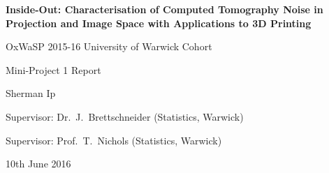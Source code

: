 \documentclass[12pt]{report}
\begin{document}
\begin{titlepage}
\centering
\vspace*{1cm}
        
        \LARGE
        \textbf{Inside-Out: Characterisation of Computed Tomography Noise in Projection and Image Space with Applications to 3D Printing}
        
		\large        
        
        \vspace{2cm}
        {OxWaSP 2015-16 University of Warwick Cohort}
        
        \vspace{1cm}
        {Mini-Project 1 Report}
        
        \vspace{1cm}
        {Sherman Ip}

        \vspace{1cm}
        {Supervisor: Dr.~J.~Brettschneider (Statistics, Warwick)}
        
        \vspace{1cm}
        {Supervisor: Prof.~T.~Nichols (Statistics, Warwick)}
        
        \vspace{1cm}
        {10th June 2016}
\end{titlepage}

\begin{abstract}
X-ray computed tomography can be used to do quality control on 3D printed samples. However there are sources of error in the 3D printing, how the photons behave and in the X-ray detector. This project aims to find a relationship between the mean and variance of the grey values of each pixel in images obtained from the X-ray detector by fitting linear regressions. In addition, latent variable models such as principle component analysis, factor analysis and the compound Poisson were attempted to be fitted to find sources of variance.
\end{abstract}

\renewcommand{\abstractname}{Acknowledgements}
\begin{abstract}
\begin{itemize}
	\item Supervisors: Julia Brettschneider and Tom Nichols
	\item Inside Out Team: Wilfrid Kendall, Audrey Kueh, Jay Warnett and Clair Barnes
	\item OxWaSP 2015 Cohort: Nathan Cunningham, Giuseppe di Benedetto, Beniamino Hadj-Amar, Jack Jewson, Ella Kaye, Leon Law, Kaspar Martens, Marcin Mider, Xenia Miscouridou, Paul Vanetti and Andi Wang.
	\item EPSRC Funding: EP/L016710/1
\end{itemize}
\end{abstract}
\end{document}
